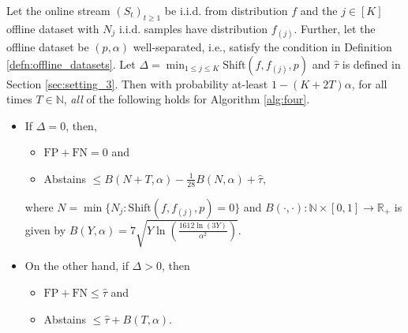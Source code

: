\begin{theorem*}[\ref{thm:setting_3}] Let the online stream $(S_t)_{t \geq 1} $ be i.i.d. from distribution $f$ and the $j \in [K]$ offline dataset with $N_j$ i.i.d. samples have distribution $f_{(j)}$. Further, let the offline dataset be $(p,\alpha)$ well-separated, i.e., satisfy the condition in Definition \ref{defn:offline_datasets}. Let $\Delta = \min_{1\leq j \leq K} \text{Shift}(f, f_{(j)},p)$ and $\widehat{\tau}$ is defined in Section \ref{sec:setting_3}. Then  with probability at-least $1-(K+2T)\alpha$, for all times $T \in \mathbb{N}$, \emph{all} of the following holds for Algorithm \ref{alg:four}. 
\begin{itemize}
    \item If $\Delta = 0$, then, 
    \begin{itemize}
        \item  $\text{FP} + \text{FN} = 0$ and  
        \item Abstains   $\leq {B}(N+T,\alpha) - \frac{1}{28}B(N,\alpha) + \widehat{\tau},$
    \end{itemize}
    where  $N = \min \{N_j: \text{Shift}(f,f_{(j)},p)=0\}$ and $B(\cdot, \cdot) : \mathbb{N} \times [0,1] \to \mathbb{R}_{+}$ is given by $B(Y,\alpha) = 7 \sqrt{Y \ln \left( \frac{1612\ln(3Y)}{\alpha^2} \right)}$.
    \item On the other hand, if  $\Delta > 0$, then
    \begin{itemize}
        \item $\text{FP}+\text{FN} \leq \widehat{\tau} $ and
        \item Abstains  $ \leq\widehat{\tau} + B(T,\alpha)$.
    \end{itemize} 
\end{itemize}

  





\end{theorem*}
